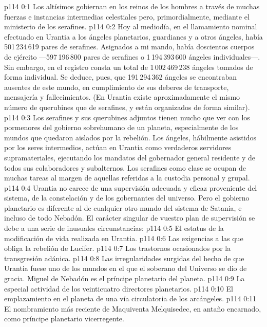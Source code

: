 \author{Jefe de los serafines}
\vs p114 0:1 Los altísimos gobiernan en los reinos de los hombres a través de muchas fuerzas e instancias intermedias celestiales pero, primordialmente, mediante el ministerio de los serafines.
\vs p114 0:2 Hoy al mediodía, en el llamamiento nominal efectuado en Urantia a los ángeles planetarios, guardianes y a otros ángeles, había 501\,234\,619 pares de serafines. Asignados a mi mando, había doscientos cuerpos de ejército ---597\,196\,800 pares de serafines o 1\,194\,393\,600 ángeles individuales---. Sin embargo, en el registro consta un total de 1\,002\,469\,238 ángeles tomados de forma individual. Se deduce, pues, que 191\,294\,362 ángeles se encontraban ausentes de este mundo, en cumplimiento de sus deberes de transporte, mensajería y fallecimientos. (En Urantia existe aproximadamente el mismo número de querubines que de serafines, y están organizados de forma similar).
\vs p114 0:3 Los serafines y sus querubines adjuntos tienen mucho que ver con los pormenores del gobierno sobrehumano de un planeta, especialmente de los mundos que quedaron aislados por la rebelión. Los ángeles, hábilmente asistidos por los seres intermedios, actúan en Urantia como verdaderos servidores supramateriales, ejecutando los mandatos del gobernador general residente y de todos sus colaboradores y subalternos. Los serafines como clase se ocupan de muchas tareas al margen de aquellas referidas a la custodia personal y grupal.
\vs p114 0:4 Urantia no carece de una supervisión adecuada y eficaz proveniente del sistema, de la constelación y de los gobernantes del universo. Pero el gobierno planetario es diferente al de cualquier otro mundo del sistema de Satania, e incluso de todo Nebadón. El carácter singular de vuestro plan de supervisión se debe a una serie de inusuales circunstancias:
\vs p114 0:5 El estatus de la modificación de vida realizada en Urantia.
\vs p114 0:6 Las exigencias a las que obliga la rebelión de Lucifer.
\vs p114 0:7 Los trastornos ocasionados por la transgresión adánica.
\vs p114 0:8 Las irregularidades surgidas del hecho de que Urantia fuese uno de los mundos en el que el soberano del Universo se dio de gracia. Miguel de Nebadón es el príncipe planetario del planeta.
\vs p114 0:9 La especial actividad de los veinticuatro directores planetarios.
\vs p114 0:10 El emplazamiento en el planeta de una vía circulatoria de los arcángeles.
\vs p114 0:11 El nombramiento más reciente de Maquiventa Melquisedec, en antaño encarnado, como príncipe planetario vicerregente.
